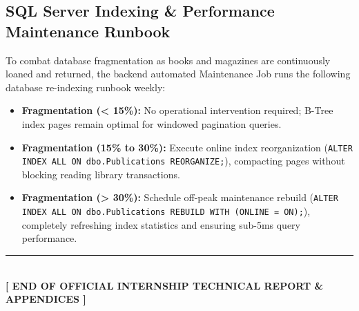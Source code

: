 \documentclass[10pt,journal,compsoc]{IEEEtran}
\begin{document}
\subsection{SQL Server Indexing \& Performance Maintenance Runbook}
To combat database fragmentation as books and magazines are continuously loaned and returned, the backend automated Maintenance Job runs the following database re-indexing runbook weekly:
\begin{itemize}[leftmargin=1.5em]
    \item \textbf{Fragmentation (< 15\%):} No operational intervention required; B-Tree index pages remain optimal for windowed pagination queries.
    \item \textbf{Fragmentation (15\% to 30\%):} Execute online index reorganization (\texttt{ALTER INDEX ALL ON dbo.Publications REORGANIZE;}), compacting pages without blocking reading library transactions.
    \item \textbf{Fragmentation (> 30\%):} Schedule off-peak maintenance rebuild (\texttt{ALTER INDEX ALL ON dbo.Publications REBUILD WITH (ONLINE = ON);}), completely refreshing index statistics and ensuring sub-5ms query performance.
\end{itemize}

\vspace{30pt}
\begin{center}
    {\color{accentgold}\rule{0.5\textwidth}{2pt}}\\[15pt]
    {\large \textbf{\color{navyblue} [ END OF OFFICIAL INTERNSHIP TECHNICAL REPORT \& APPENDICES ]}}
\end{center}
\end{document}
